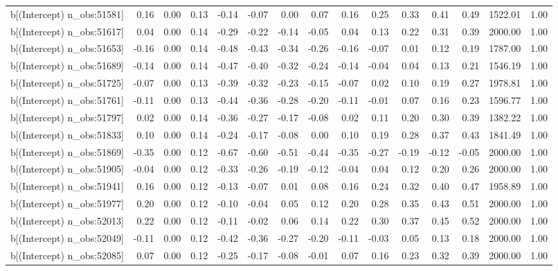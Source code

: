 \begin{table}[ht]
\begin{tabular}{rrrrrrrrrrrrrrr}
  b[(Intercept) n\_obs:51581] & 0.16 & 0.00 & 0.13 & -0.14 & -0.07 & 0.00 & 0.07 & 0.16 & 0.25 & 0.33 & 0.41 & 0.49 & 1522.01 & 1.00 \\ 
  b[(Intercept) n\_obs:51617] & 0.04 & 0.00 & 0.14 & -0.29 & -0.22 & -0.14 & -0.05 & 0.04 & 0.13 & 0.22 & 0.31 & 0.39 & 2000.00 & 1.00 \\ 
  b[(Intercept) n\_obs:51653] & -0.16 & 0.00 & 0.14 & -0.48 & -0.43 & -0.34 & -0.26 & -0.16 & -0.07 & 0.01 & 0.12 & 0.19 & 1787.00 & 1.00 \\ 
  b[(Intercept) n\_obs:51689] & -0.14 & 0.00 & 0.14 & -0.47 & -0.40 & -0.32 & -0.24 & -0.14 & -0.04 & 0.04 & 0.13 & 0.21 & 1546.19 & 1.00 \\ 
  b[(Intercept) n\_obs:51725] & -0.07 & 0.00 & 0.13 & -0.39 & -0.32 & -0.23 & -0.15 & -0.07 & 0.02 & 0.10 & 0.19 & 0.27 & 1978.81 & 1.00 \\ 
  b[(Intercept) n\_obs:51761] & -0.11 & 0.00 & 0.13 & -0.44 & -0.36 & -0.28 & -0.20 & -0.11 & -0.01 & 0.07 & 0.16 & 0.23 & 1596.77 & 1.00 \\ 
  b[(Intercept) n\_obs:51797] & 0.02 & 0.00 & 0.14 & -0.36 & -0.27 & -0.17 & -0.08 & 0.02 & 0.11 & 0.20 & 0.30 & 0.39 & 1382.22 & 1.00 \\ 
  b[(Intercept) n\_obs:51833] & 0.10 & 0.00 & 0.14 & -0.24 & -0.17 & -0.08 & 0.00 & 0.10 & 0.19 & 0.28 & 0.37 & 0.43 & 1841.49 & 1.00 \\ 
  b[(Intercept) n\_obs:51869] & -0.35 & 0.00 & 0.12 & -0.67 & -0.60 & -0.51 & -0.44 & -0.35 & -0.27 & -0.19 & -0.12 & -0.05 & 2000.00 & 1.00 \\ 
  b[(Intercept) n\_obs:51905] & -0.04 & 0.00 & 0.12 & -0.33 & -0.26 & -0.19 & -0.12 & -0.04 & 0.04 & 0.12 & 0.20 & 0.26 & 2000.00 & 1.00 \\ 
  b[(Intercept) n\_obs:51941] & 0.16 & 0.00 & 0.12 & -0.13 & -0.07 & 0.01 & 0.08 & 0.16 & 0.24 & 0.32 & 0.40 & 0.47 & 1958.89 & 1.00 \\ 
  b[(Intercept) n\_obs:51977] & 0.20 & 0.00 & 0.12 & -0.10 & -0.04 & 0.05 & 0.12 & 0.20 & 0.28 & 0.35 & 0.43 & 0.51 & 2000.00 & 1.00 \\ 
  b[(Intercept) n\_obs:52013] & 0.22 & 0.00 & 0.12 & -0.11 & -0.02 & 0.06 & 0.14 & 0.22 & 0.30 & 0.37 & 0.45 & 0.52 & 2000.00 & 1.00 \\ 
  b[(Intercept) n\_obs:52049] & -0.11 & 0.00 & 0.12 & -0.42 & -0.36 & -0.27 & -0.20 & -0.11 & -0.03 & 0.05 & 0.13 & 0.18 & 2000.00 & 1.00 \\ 
  b[(Intercept) n\_obs:52085] & 0.07 & 0.00 & 0.12 & -0.25 & -0.17 & -0.08 & -0.01 & 0.07 & 0.16 & 0.23 & 0.32 & 0.39 & 2000.00 & 1.00 \\ 

\end{tabular}
\end{table}
